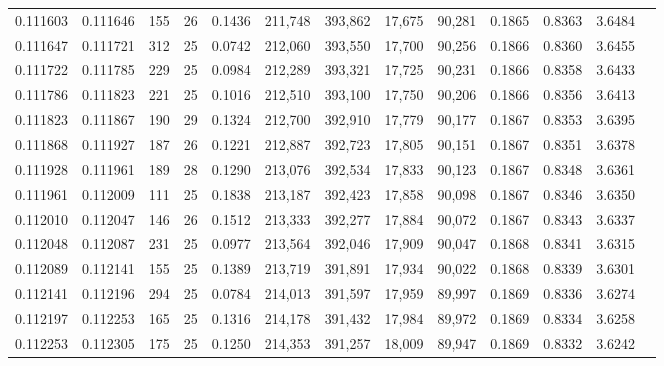 \begin{tabular}{rrrrrrrrrrrrr}
0.111603 & 0.111646 & 155 &  26 &                                     0.1436 & 211,748 & 393,862 &  17,675 &  90,281 & 0.1865 & 0.8363 & 3.6484 \\
0.111647 & 0.111721 & 312 &  25 &                                     0.0742 & 212,060 & 393,550 &  17,700 &  90,256 & 0.1866 & 0.8360 & 3.6455 \\
0.111722 & 0.111785 & 229 &  25 &                                     0.0984 & 212,289 & 393,321 &  17,725 &  90,231 & 0.1866 & 0.8358 & 3.6433 \\
0.111786 & 0.111823 & 221 &  25 &                                     0.1016 & 212,510 & 393,100 &  17,750 &  90,206 & 0.1866 & 0.8356 & 3.6413 \\
0.111823 & 0.111867 & 190 &  29 &                                     0.1324 & 212,700 & 392,910 &  17,779 &  90,177 & 0.1867 & 0.8353 & 3.6395 \\
0.111868 & 0.111927 & 187 &  26 &                                     0.1221 & 212,887 & 392,723 &  17,805 &  90,151 & 0.1867 & 0.8351 & 3.6378 \\
0.111928 & 0.111961 & 189 &  28 &                                     0.1290 & 213,076 & 392,534 &  17,833 &  90,123 & 0.1867 & 0.8348 & 3.6361 \\
0.111961 & 0.112009 & 111 &  25 &                                     0.1838 & 213,187 & 392,423 &  17,858 &  90,098 & 0.1867 & 0.8346 & 3.6350 \\
0.112010 & 0.112047 & 146 &  26 &                                     0.1512 & 213,333 & 392,277 &  17,884 &  90,072 & 0.1867 & 0.8343 & 3.6337 \\
0.112048 & 0.112087 & 231 &  25 &                                     0.0977 & 213,564 & 392,046 &  17,909 &  90,047 & 0.1868 & 0.8341 & 3.6315 \\
0.112089 & 0.112141 & 155 &  25 &                                     0.1389 & 213,719 & 391,891 &  17,934 &  90,022 & 0.1868 & 0.8339 & 3.6301 \\
0.112141 & 0.112196 & 294 &  25 &                                     0.0784 & 214,013 & 391,597 &  17,959 &  89,997 & 0.1869 & 0.8336 & 3.6274 \\
0.112197 & 0.112253 & 165 &  25 &                                     0.1316 & 214,178 & 391,432 &  17,984 &  89,972 & 0.1869 & 0.8334 & 3.6258 \\
0.112253 & 0.112305 & 175 &  25 &                                     0.1250 & 214,353 & 391,257 &  18,009 &  89,947 & 0.1869 & 0.8332 & 3.6242 \\

\end{tabular}
